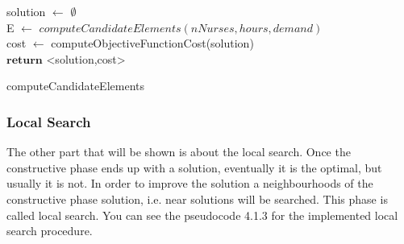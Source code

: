 \begin{algorithm}[H]


solution $\leftarrow$ $\emptyset$ \\
E $\leftarrow$ $computeCandidateElements(nNurses, hours, demand)$ \\
cost $\leftarrow$ computeObjectiveFunctionCost(solution)\\
$\textbf{return}$ <solution,cost>
\caption{computeCandidateElements}\label{alg.mainLoop}
\end{algorithm}


\subsubsection{Local Search}

The other part that will be shown is about the local search. Once the constructive phase ends up with a solution, eventually it is the optimal, but usually it is not. In order to improve the solution a neighbourhoods of the constructive phase solution, i.e. near solutions will be searched. This phase is called local search. You can see the pseudocode 4.1.3 for the implemented local search procedure.

